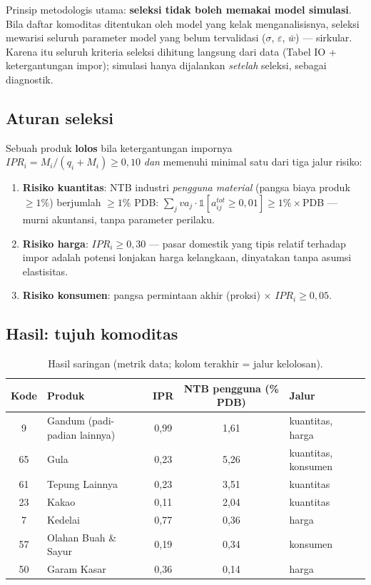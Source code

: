 \documentclass[11pt,a4paper]{article}
\begin{document}
Prinsip metodologis utama: \textbf{seleksi tidak boleh memakai model
simulasi}. Bila daftar komoditas ditentukan oleh model yang kelak
menganalisisnya, seleksi mewarisi seluruh parameter model yang belum
tervalidasi ($\sigma$, $\varepsilon$, $\bar w$) --- sirkular. Karena itu
seluruh kriteria seleksi dihitung langsung dari data (Tabel IO +
ketergantungan impor); simulasi hanya dijalankan \emph{setelah} seleksi,
sebagai diagnostik.

\subsection{Aturan seleksi}

Sebuah produk \textbf{lolos} bila ketergantungan impornya
$IPR_i = M_i/(q_i + M_i) \geq 0{,}10$ \emph{dan} memenuhi minimal satu
dari tiga jalur risiko:
\begin{enumerate}[nosep]
\item \textbf{Risiko kuantitas}: NTB industri \emph{pengguna material}
      (pangsa biaya produk $\geq 1\%$) berjumlah $\geq 1\%$ PDB:
      $\sum_j va_j \cdot \mathbb{1}[a^{tot}_{ij} \geq 0{,}01] \geq
      1\%\times$PDB --- murni akuntansi, tanpa parameter perilaku.
\item \textbf{Risiko harga}: $IPR_i \geq 0{,}30$ --- pasar domestik yang
      tipis relatif terhadap impor adalah potensi lonjakan harga
      kelangkaan, dinyatakan tanpa asumsi elastisitas.
\item \textbf{Risiko konsumen}: pangsa permintaan akhir (proksi) $\times$
      $IPR_i \geq 0{,}05$.
\end{enumerate}

\subsection{Hasil: tujuh komoditas}

\begin{table}[ht]
\centering\small
\caption{Hasil saringan (metrik data; kolom terakhir = jalur kelolosan).}
\label{tab:screen}
\begin{tabular}{@{}clccl@{}}
\toprule
Kode & Produk & IPR & NTB pengguna (\% PDB) & Jalur \\
\midrule
9  & Gandum (padi-padian lainnya) & 0{,}99 & 1{,}61 & kuantitas, harga \\
65 & Gula                         & 0{,}23 & 5{,}26 & kuantitas, konsumen \\
61 & Tepung Lainnya               & 0{,}23 & 3{,}51 & kuantitas \\
23 & Kakao                        & 0{,}11 & 2{,}04 & kuantitas \\
7  & Kedelai                      & 0{,}77 & 0{,}36 & harga \\
57 & Olahan Buah \& Sayur         & 0{,}19 & 0{,}34 & konsumen \\
50 & Garam Kasar                  & 0{,}36 & 0{,}14 & harga \\
\bottomrule
\end{tabular}
\end{table}
\end{document}
